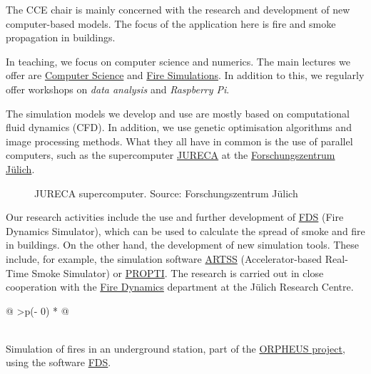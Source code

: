 \documentclass[
  letterpaper,
  DIV=11,
  numbers=noendperiod]{scrreprt}
\begin{document}
The CCE chair is mainly concerned with the research and development of
new computer-based models. The focus of the application here is fire and
smoke propagation in buildings.

In teaching, we focus on computer science and numerics. The main
lectures we offer are
\href{https://cce.uni-wuppertal.de/index.php?id=4178&L=0}{Computer
Science} and
\href{https://cce.uni-wuppertal.de/index.php?id=4185&L=0}{Fire
Simulations}. In addition to this, we regularly offer workshops on
\emph{data analysis} and \emph{Raspberry Pi}.

The simulation models we develop and use are mostly based on
computational fluid dynamics (CFD). In addition, we use genetic
optimisation algorithms and image processing methods. What they all have
in common is the use of parallel computers, such as the supercomputer
\href{https://www.fz-juelich.de/ias/jsc/EN/Expertise/Supercomputers/JURECA/JURECA_node.html}{JURECA}
at the
\href{https://fz-juelich.de/portal/DE/Home/home_node.html}{Forschungszentrum
Jülich}.

\begin{figure}


\caption{\label{fig-jureca}JURECA supercomputer. Source:
Forschungszentrum Jülich}

\end{figure}%

Our research activities include the use and further development of
\href{https://pages.nist.gov/fds-smv/}{FDS} (Fire Dynamics Simulator),
which can be used to calculate the spread of smoke and fire in
buildings. On the other hand, the development of new simulation tools.
These include, for example, the simulation software
\href{https://github.com/FireDynamics/ARTSS}{ARTSS} (Accelerator-based
Real-Time Smoke Simulator) or
\href{https://github.com/FireDynamics/propti}{PROPTI}. The research is
carried out in close cooperation with the
\href{https://www.fz-juelich.de/ias/ias-7/EN/Research/Fire_Dynamics/_node.html}{Fire
Dynamics} department at the Jülich Research Centre.

\begin{longtable}[]{@{}
  >{\centering\arraybackslash}p{(\columnwidth - 0\tabcolsep) * }@{}}
\toprule\noalign{}
\begin{minipage}[b]{\linewidth}\centering
\end{minipage} \\
\midrule\noalign{}
\endhead
\bottomrule\noalign{}
\endlastfoot
Simulation of fires in an underground station, part of the
\href{http://www.orpheus-projekt.de}{ORPHEUS project}, using the
software \href{https://pages.nist.gov/fds-smv/}{FDS}. \\
\end{longtable}
\end{document}
